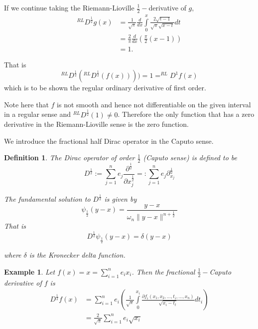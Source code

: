 \documentclass{amsart}%
\theoremstyle{plain}
\newtheorem{definition}{Definition}
\newtheorem{example}{Example}
\numberwithin{equation}{section}
\begin{document}
If we continue taking the Riemann-Lioville $\frac{1}{2}-$derivative of $g,$%
\begin{align*}
^{RL}D^{\frac{1}{2}}g\left(  x\right)   & =\frac{1}{\sqrt{\pi}}\frac{d}{dx}%
{\displaystyle\int\limits_{0}^{x}}
\frac{2\sqrt{t-1}}{\sqrt{\pi}\sqrt{x-t}}dt\\
& =\frac{2}{\pi}\frac{d}{dx}\left(  \frac{\pi}{2}\left(  x-1\right)  \right)
\\
& =1.
\end{align*}


That is
\[
^{RL}D^{\frac{1}{2}}\left(  ^{RL}D^{\frac{1}{2}}(f(x))\right)  )=1=^{RL}%
D^{1}f(x)
\]
which is to be shown the regular ordinary derivative of first order.

Note here that $f$ is not smooth and hence not differentiable on the given
interval in a regular sense and $^{RL}D^{\frac{1}{2}}(1)\neq0$. Therefore the
only function that has a zero derivative in the Riemann-Lioville sense is the
zero function.

We introduce the fractional half Dirac operator in the Caputo sense.

\begin{definition}
The Dirac operator of order $\frac{1}{2}$ (Caputo sense) is defined to be
\[
D^{\frac{1}{2}}:=%
{\displaystyle\sum\limits_{j=1}^{n}}
e_{j}\frac{\partial^{\frac{1}{2}}}{\partial x_{j}^{\frac{1}{2}}}=:%
{\displaystyle\sum\limits_{j=1}^{n}}
e_{j}\partial_{x_{j}}^{\frac{1}{2}}%
\]


The fundamental solution to $D^{\frac{1}{2}}$ is given by
\[
\psi_{\frac{1}{2}}\left(  y-x\right)  =\frac{y-x}{\omega_{n}\parallel
y-x\parallel^{n+\frac{1}{2}}}%
\]
That is
\[
D^{\frac{1}{2}}\psi_{\frac{1}{2}}\left(  y-x\right)  =\delta\left(
y-x\right)
\]


where $\delta$ is the Kronecker delta function.
\end{definition}

\begin{example}
Let $f(x)=x=%
{\displaystyle\sum\limits_{i=1}^{n}}
e_{i}x_{i}$. Then the fractional $\frac{1}{2}-$Caputo derivative of $f$ is
\begin{align*}
D^{\frac{1}{2}}f(x)  & =%
{\displaystyle\sum\limits_{i=1}^{n}}
e_{i}\left(  \frac{1}{\sqrt{\pi}}%
{\displaystyle\int\limits_{0}^{x_{i}}}
\frac{\partial f_{i}\left(  x_{1},x_{2},...,t_{i},...,x_{n}\right)  }%
{\sqrt{x_{i}-t_{t}}}dt_{i}\right) \\
& =\frac{2}{\sqrt{\pi}}%
{\displaystyle\sum\limits_{i=1}^{n}}
e_{i}\sqrt{x_{i}}%
\end{align*}

\end{example}
\end{document}
